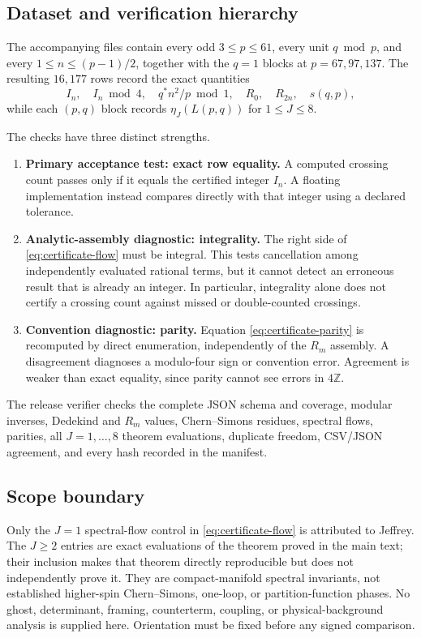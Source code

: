 \subsection{Dataset and verification hierarchy}

The accompanying files contain every odd $3\leq p\leq61$, every unit
$q\bmod p$, and every $1\leq n\leq(p-1)/2$, together with the $q=1$ blocks
at $p=67,97,137$.  The resulting $16{,}177$ rows record the exact quantities
\[
 I_n,\quad I_n\bmod4,\quad q^*n^2/p\bmod1,\quad
 R_0,\quad R_{2n},\quad s(q,p),
\]
while each $(p,q)$ block records $\eta_J(L(p,q))$ for $1\leq J\leq8$.

The checks have three distinct strengths.

\begin{enumerate}
\item \textbf{Primary acceptance test: exact row equality.}
A computed crossing count passes only if it equals the certified integer
$I_n$.  A floating implementation instead compares directly with that
integer using a declared tolerance.

\item \textbf{Analytic-assembly diagnostic: integrality.}
The right side of \eqref{eq:certificate-flow} must be integral.  This tests
cancellation among independently evaluated rational terms, but it cannot
detect an erroneous result that is already an integer.  In particular,
integrality alone does not certify a crossing count against missed or
double-counted crossings.

\item \textbf{Convention diagnostic: parity.}
Equation \eqref{eq:certificate-parity} is recomputed by direct enumeration,
independently of the $R_m$ assembly.  A disagreement diagnoses a modulo-four
sign or convention error.  Agreement is weaker than exact equality, since
parity cannot see errors in $4\mathbb Z$.
\end{enumerate}

The release verifier checks the complete JSON schema and coverage, modular
inverses, Dedekind and $R_m$ values, Chern--Simons residues, spectral flows,
parities, all $J=1,\ldots,8$ theorem evaluations, duplicate freedom,
CSV/JSON agreement, and every hash recorded in the manifest.

\subsection{Scope boundary}

Only the $J=1$ spectral-flow control in \eqref{eq:certificate-flow} is
attributed to Jeffrey.  The $J\geq2$ entries are exact evaluations of the
theorem proved in the main text; their inclusion makes that theorem directly
reproducible but does not independently prove it.  They are compact-manifold
spectral invariants, not established higher-spin Chern--Simons, one-loop, or
partition-function phases.  No ghost, determinant, framing, counterterm,
coupling, or physical-background analysis is supplied here.  Orientation must
be fixed before any signed comparison.
